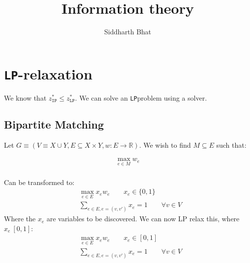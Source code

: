 \documentclass[11pt]{book}
\title{Information theory}
\author{Siddharth Bhat}
\date{}
\newcommand{\ip}{\texttt{IP} }
\renewcommand{\ip}{\texttt{IP}}
\newcommand{\lp}{\texttt{LP}}
\newcommand{\R}{\ensuremath{\mathbb{R}}}
\begin{document}
\maketitle
\tableofcontents

\chapter{\lp-relaxation}

We know that $z^*_\ip \leq z^*_\lp$. We can solve an \lp problem using
a solver.

\section{Bipartite Matching}
Let $G \equiv (V \equiv X \cup Y, E \subseteq X \times Y, w: E \rightarrow \R)$. We wish 
to find $M \subseteq E$ such that:

\begin{align*}
\max_{e \in M} w_e \\
\end{align*}

Can be transformed to:
\begin{align*}
    &\max_{e \in E} x_e w_e \qquad x_e \in \{0, 1\} \\
    &\sum_{e \in E, e = (v, v')} x_e = 1 \qquad \forall v \in V
\end{align*}
Where the $x_e$ are variables to be discovered.  
We can now LP relax this, where $x_e \ [0, 1]$:
\begin{align*}
    &\max_{e \in E} x_e w_e \qquad x_e \in [0, 1] \\
    &\sum_{e \in E, e = (v, v')} x_e = 1 \qquad \forall v \in V
\end{align*}
\end{document}
